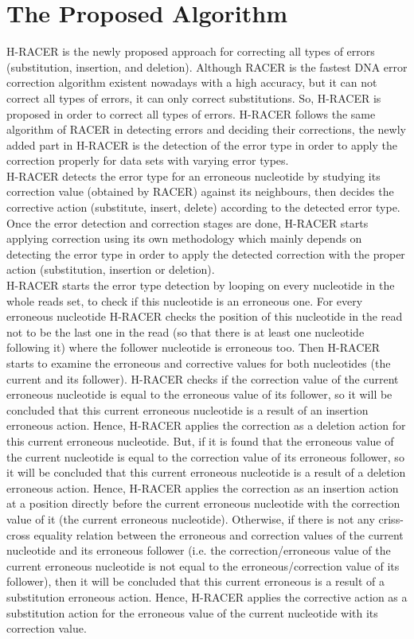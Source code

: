 \documentclass{llncs}
\begin{document}
\section{\label{sec:3}The Proposed Algorithm}
H-RACER is the newly proposed approach for correcting all types of errors (substitution, insertion, and deletion). Although RACER is the fastest DNA error correction algorithm existent nowadays with a high accuracy, but it can not correct all types of errors, it can only correct substitutions. So, H-RACER is proposed in order to correct all types of errors. H-RACER follows the same algorithm of RACER in detecting errors and deciding their corrections, the newly added part in H-RACER is the detection of the error type in order to apply the correction properly for data sets with varying error types.
\\
H-RACER detects the error type for an erroneous nucleotide by studying its correction value (obtained by RACER) against its neighbours, then decides the corrective action (substitute, insert, delete) according to the detected error type.
Once the error detection and correction stages are done, H-RACER starts applying correction using its own methodology which mainly depends on detecting the error type in order to apply the detected correction with the proper action (substitution, insertion or deletion).
\\
H-RACER starts the error type detection by looping on every nucleotide in the whole reads set, to check if this nucleotide is an erroneous one. For every erroneous nucleotide H-RACER checks the position of this nucleotide in the read not to be the last one in the read (so that there is at least one nucleotide following it) where the follower nucleotide is erroneous too. Then H-RACER starts to examine the erroneous and corrective values for both nucleotides (the current and its follower). H-RACER checks if the correction value of the current erroneous nucleotide is equal to the erroneous value of its follower, so it will be concluded that this current erroneous nucleotide is a result of an insertion erroneous action. Hence, H-RACER applies the correction as a deletion action for this current erroneous nucleotide. But, if it is found that the erroneous value of the current nucleotide is equal to the correction value of its erroneous follower, so it will be concluded that this current erroneous nucleotide is a result of a deletion erroneous action. Hence, H-RACER applies the correction as an insertion action at a position directly before the current erroneous nucleotide with the correction value of it (the current erroneous nucleotide). Otherwise, if there is not any criss-cross equality relation between the erroneous and correction values of the current nucleotide and its erroneous follower (i.e. the correction/erroneous value of the current erroneous nucleotide is not equal to the erroneous/correction value of its follower), then it will be concluded that this current erroneous is a result of a substitution erroneous action. Hence, H-RACER applies the corrective action as a substitution action for the erroneous value of the current nucleotide with its correction value.
\end{document}
